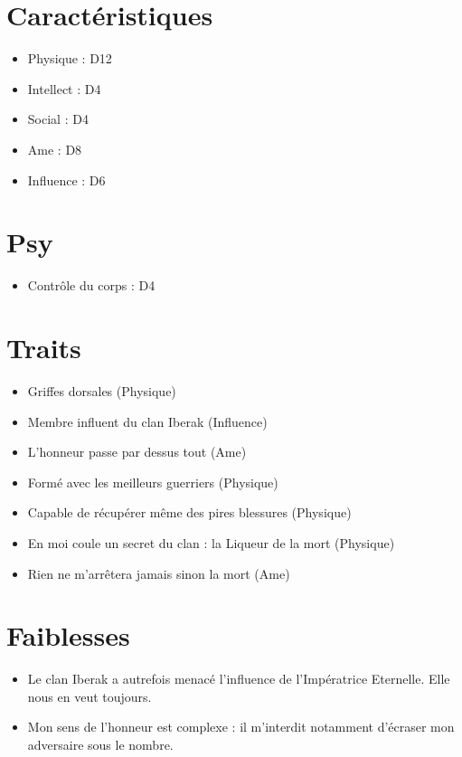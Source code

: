 \begin{multicols}{2}

\section*{Caractéristiques}

\begin{itemize}
\item Physique : D12
\item Intellect : D4
\item Social : D4
\item Ame : D8
\item Influence : D6
\end{itemize}

\section*{Psy}

\begin{itemize}
\item Contrôle du corps : D4
\end{itemize}

\section*{Traits}

\begin{itemize}
\item Griffes dorsales (Physique)
\item Membre influent du clan Iberak (Influence)
\item L'honneur passe par dessus tout (Ame)
\item Formé avec les meilleurs guerriers (Physique)
\item Capable de récupérer même des pires blessures (Physique)
\item En moi coule un secret du clan : la Liqueur de la mort (Physique)
\item Rien ne m'arrêtera jamais sinon la mort (Ame)
\end{itemize}

\section*{Faiblesses}

\begin{itemize}
\item Le clan Iberak a autrefois menacé l'influence de l'Impératrice Eternelle. Elle nous en veut toujours.
\item Mon sens de l'honneur est complexe : il m'interdit notamment d'écraser mon adversaire sous le nombre.
\end{itemize}


\end{multicols}
